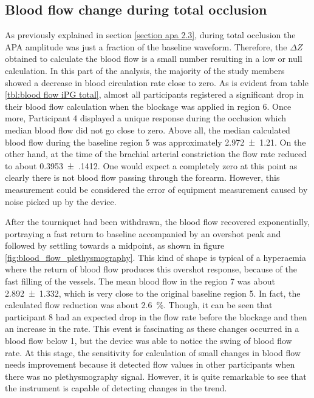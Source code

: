 \subsection{Blood flow change during total occlusion}
\label{section apa 3.3}
As previously explained in section \ref{section apa 2.3}, during total occlusion the APA amplitude was just a fraction of the baseline waveform.  Therefore, the $\Delta Z$ obtained to calculate the blood flow is a small number resulting in a low or null calculation. In this part of the analysis, the majority of the study members showed a decrease in blood circulation rate close to zero.  As is evident from table \ref{tbl:blood flow iPG total}, almost all participants registered a significant drop in their blood flow calculation when the blockage was applied in region 6. Once more, Participant 4 displayed a unique response during the occlusion which median blood flow did not go close to zero. Above all, the median calculated blood flow during the baseline region 5 was approximately \SI{2.972(1210)}{\bfv}. On the other hand, at the time of the brachial arterial constriction the flow rate reduced to about \SI{0.3953(1412)}{\bfv}. One would expect a completely zero at this point as clearly there is not blood flow passing through the forearm. However, this measurement could be considered the error of equipment measurement caused by noise picked up by the device. 

After the tourniquet had been withdrawn, the blood flow recovered exponentially, portraying a fast return to baseline accompanied by an overshot peak and followed by settling towards a midpoint, as shown in figure \ref{fig:blood_flow_plethysmography}. This kind of shape is typical of a hyperaemia where the return of blood flow produces this overshot response, because of the fast filling of the vessels. The mean blood flow in the region 7 was about \SI{2.892(1332)}{\bfv}, which is very close to the original baseline region 5. In fact, the calculated flow reduction was about \SI{2.6}{\percent}. Though, it can be seen that participant 8 had an expected drop in the flow rate before the blockage and then an increase in the rate. This event is fascinating as these changes occurred in a blood flow below \SI{1}{\bfv}, but the device was able to notice the swing of blood flow rate. At this stage, the sensitivity for calculation of small changes in blood flow needs improvement because it detected flow values in other participants when there was no plethysmography signal. However, it is quite remarkable to see that the instrument is capable of detecting changes in the trend.

